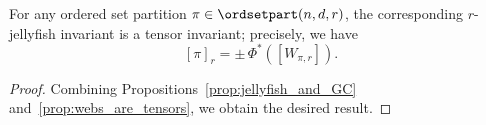 \begin{theorem}
For any ordered set partition $\pi \in \ordsetpart(n,d,r)$, the corresponding $r$-jellyfish invariant is a tensor invariant; precisely, we have \[[\pi]_r = \pm \, \Phi^*([W_{\pi,r}]).\]
\end{theorem}
\begin{proof}
    Combining Propositions~\ref{prop:jellyfish_and_GC} and~\ref{prop:webs_are_tensors}, we obtain the desired result.
\end{proof}
